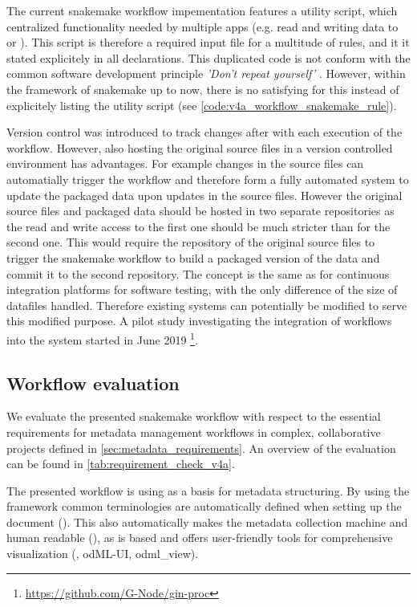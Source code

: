 The current snakemake workflow impementation features a utility script, which centralized functionality needed by multiple apps (e.g. read and writing data to  or ). This script is therefore a required input file for a multitude of rules, and it it stated explicitely in all  declarations. This duplicated code is not conform with the common software development principle \textit{'Don't repeat yourself'} \citep{Martin_2008}. However, within the framework of snakemake up to now, there is no satisfying for this instead of explicitely listing the utility script (see \cref{code:v4a_workflow_snakemake_rule}). 

Version control was introduced to track changes after with each execution of the workflow. However, also hosting the original source files in a version controlled environment has advantages. For example changes in the source files can automatially trigger the workflow and therefore form a fully automated system to update the packaged data upon updates in the source files. However the original source files and packaged data should be hosted in two separate repositories as the read and write access to the first one should be much stricter than for the second one. This would require the repository of the original source files to trigger the snakemake workflow to build a packaged version of the data and commit it to the second repository. The concept is the same as for continuous integration platforms for software testing, with the only difference of the size of datafiles handled. Therefore existing systems can potentially be modified to serve this modified purpose. A pilot study investigating the integration of  workflows into the  system started in June 2019 \footnote{\url{https://github.com/G-Node/gin-proc}}.


\subsection{Workflow evaluation}
We evaluate the presented snakemake workflow with respect to the essential requirements for metadata management workflows in complex, collaborative projects defined in \cref{sec:metadata_requirements}. An overview of the evaluation can be found in \cref{tab:requirement_check_v4a}.

The presented workflow is using  as a basis for metadata structuring. By using the  framework common terminologies are automatically defined when setting up the  document (). This also automatically makes the metadata collection machine and human readable (), as  is  based and offers user-friendly tools for comprehensive visualization (, odML-UI, odml\_view).

